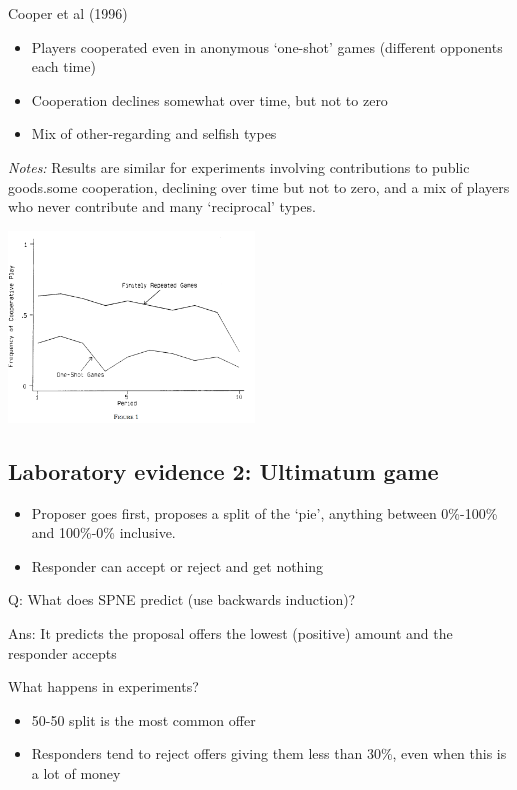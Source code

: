 \documentclass[]{article}
\providecommand{\tightlist}{%
  \setlength{\itemsep}{0pt}\setlength{\parskip}{0pt}}
\begin{document}
Cooper et al (1996)

\begin{itemize}
\tightlist
\item
  Players cooperated even in anonymous `one-shot' games (different
  opponents each time)
\item
  Cooperation declines somewhat over time, but not to zero
\item
  Mix of other-regarding and selfish types
\end{itemize}

\emph{Notes:} Results are similar for experiments involving
contributions to public goods.some cooperation, declining over time but
not to zero, and a mix of players who never contribute and many
`reciprocal' types.

\includegraphics[height=2in]{picsfigs/cooperPD.png}

\hypertarget{laboratory-evidence-2-ultimatum-game}{%
\subsection{Laboratory evidence 2: Ultimatum
game}\label{laboratory-evidence-2-ultimatum-game}}

\begin{itemize}
\tightlist
\item
  Proposer goes first, proposes a split of the `pie', anything between
  0\%-100\% and 100\%-0\% inclusive.
\item
  Responder can accept or reject and get nothing
\end{itemize}

Q: What does SPNE predict (use backwards induction)?

Ans: It predicts the proposal offers the lowest (positive) amount and
the responder accepts

\bigskip

What happens in experiments?

\begin{itemize}
\tightlist
\item
  50-50 split is the most common offer
\item
  Responders tend to reject offers giving them less than 30\%, even when
  this is a lot of money
\end{itemize}
\end{document}
